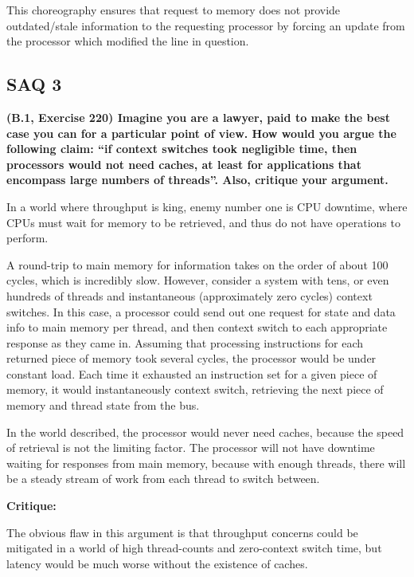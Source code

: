 \documentclass[12pt]{article}
\begin{document}
This choreography ensures that request to memory does not provide outdated/stale information to the requesting processor by forcing an update from the processor which modified the line in question. 

\subsection*{SAQ 3}
\textbf{(B.1, Exercise 220) Imagine you are a lawyer, paid to make the best case you can for a particular point of view. How would you argue the following claim: “if context switches took negligible time, then processors would not need caches, at least for applications that encompass large numbers of threads”. Also, critique your argument.
}

\vspace{5mm}

In a world where throughput is king, enemy number one is CPU downtime, where CPUs must wait for memory to be retrieved, and thus do not have operations to perform.

A round-trip to main memory for information takes on the order of about 100 cycles, which is incredibly slow. However, consider a system with tens, or even hundreds of threads and instantaneous (approximately zero cycles) context switches. In this case, a processor could send out one request for state and data info to main memory per thread, and then context switch to each appropriate response as they came in. Assuming that processing instructions for each returned piece of memory took several cycles, the processor would be under constant load. Each time it exhausted an instruction set for a given piece of memory, it would instantaneously context switch, retrieving the next piece of memory and thread state from the bus. 

In the world described, the processor would never need caches, because the speed of retrieval is not the limiting factor. The processor will not have downtime waiting for responses from main memory, because with enough threads, there will be a steady stream of work from each thread to switch between.   

\vspace{5mm}
\textbf{Critique:}

\vspace{5mm}
The obvious flaw in this argument is that throughput concerns could be mitigated in a world of high thread-counts and zero-context switch time, but latency would be much worse without the existence of caches. 
\end{document}
